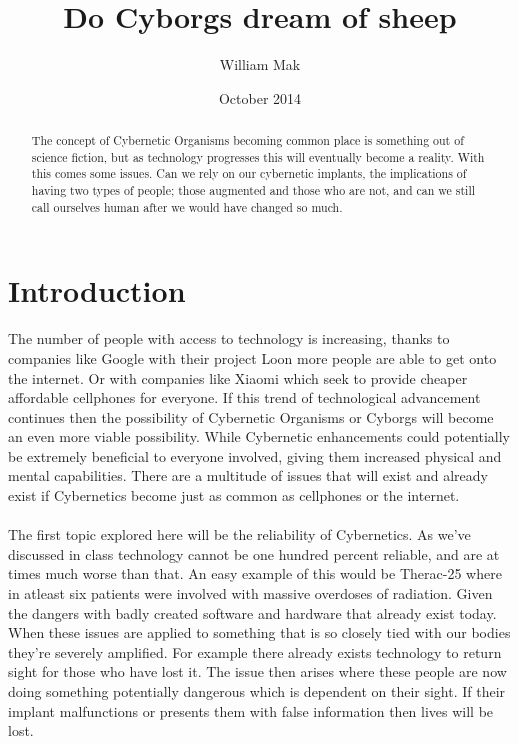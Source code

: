 \documentclass[12pt,a4paper,notitlepage]{article}
\title{Do Cyborgs dream of sheep}
\author{William Mak}
\date{October 2014}
\begin{document}
\maketitle
    \begin{abstract}
        The concept of Cybernetic Organisms becoming common place is something out of science fiction, but as technology progresses this will eventually become a reality. With this comes some issues. Can we rely on our cybernetic implants, the implications of having two types of people; those augmented and those who are not, and can we still call ourselves human after we would have changed so much.
    \end{abstract}

\section{Introduction}
    The number of people with access to technology is increasing, thanks to 
companies like Google with their project Loon more people are able to get onto
the internet. Or with companies like Xiaomi which seek to provide cheaper
affordable cellphones for everyone. If this trend of technological advancement 
continues then the possibility of Cybernetic Organisms or Cyborgs will become an
even more viable possibility. While Cybernetic enhancements could potentially be
extremely beneficial to everyone involved, giving them increased physical and
mental capabilities. There are a multitude of issues that will exist and already
exist if Cybernetics become just as common as cellphones or the internet.
\\\\
    The first topic explored here will be the reliability of Cybernetics. As
we've discussed in class technology cannot be one hundred percent reliable, and 
are at times much worse than that. An easy example of this would be Therac-25
where in atleast six patients were involved with massive overdoses of radiation.
Given the dangers with badly created software and hardware that already exist
today. When these issues are applied to something that is so closely tied with
our bodies they're severely amplified. For example there already exists
technology to return sight for those who have lost it. The issue then arises 
where these people are now doing something potentially dangerous which is
dependent on their sight. If their implant malfunctions or presents them with 
false information then lives will be lost.
\\\\
\end{document}
